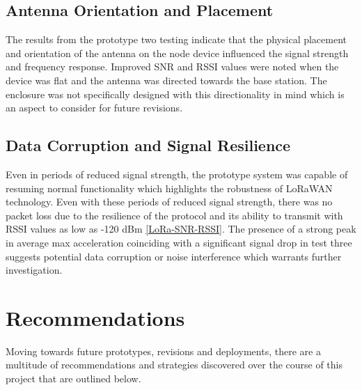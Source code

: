 \subsection{Antenna Orientation and Placement}
The results from the prototype two testing indicate that the physical placement and orientation of the antenna on the node device influenced the signal strength and frequency response. Improved SNR and RSSI values were noted when the device was flat and the antenna was directed towards the base station. The enclosure was not specifically designed with this directionality in mind which is an aspect to consider for future revisions.
\subsection{Data Corruption and Signal Resilience}
Even in periods of reduced signal strength, the prototype system was capable of resuming normal functionality which highlights the robustness of LoRaWAN technology. Even with these periods of reduced signal strength, there was no packet loss due to the resilience of the protocol and its ability to transmit with RSSI values as low as -120 dBm \ref{LoRa-SNR-RSSI}. The presence of a strong peak in average max acceleration coinciding with a significant signal drop in test three suggests potential data corruption or noise interference which warrants further investigation. 

\section{Recommendations}
Moving towards future prototypes, revisions and deployments, there are a multitude of recommendations and strategies discovered over the course of this project that are outlined below. 

